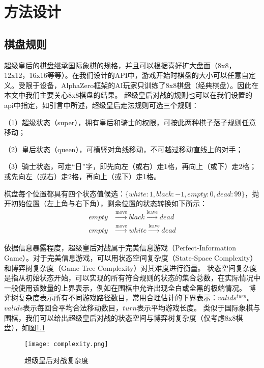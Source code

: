 \chapter{方法设计}
\label{chap:algorithm}

\section{棋盘规则}
超级皇后的棋盘继承国际象棋的规格，并且可以根据喜好扩大盘面（8x8，12x12，16x16等等）。在我们设计的API中，游戏开始时棋盘的大小可以任意自定义。受限于设备，AlphaZero框架的AI玩家只训练了8x8棋盘（经典棋盘）。因此在本文中我们主要关心8x8棋盘的结果。
超级皇后对战的规则也可以在我们设置的api中指定，如引言中所述，超级皇后走法规则可选三个规则：

（1）超级状态（super），拥有皇后和骑士的权限，可按此两种棋子落子规则任意移动；

（2）皇后状态（queen），可横竖对角线移动，不可越过移动直线上的对手；

（3）骑士状态，可走“日”字，即先向左（或右）走1格，再向上（或下）走2格；或先向左（或右）走2格，再向上（或下）走1格。

棋盘每个位置都具有四个状态值候选：$\{white:1, black:-1,empty:0,dead:99\}$，抛开初始位置（左上角与右下角），剩余位置的状态转换如下所示：
\begin{equation}
    \begin{aligned}
    empty &\stackrel{\mathrm{move}}{\longrightarrow} black \stackrel{\mathrm{leave}}{\longrightarrow} dead \\
    empty &\stackrel{\mathrm{move}}{\longrightarrow} white \stackrel{\mathrm{leave}}{\longrightarrow} dead 
    \end{aligned}
\end{equation}

依据信息暴露程度，超级皇后对战属于完美信息游戏（Perfect-Information Game）\cite{binmore2007game}。对于完美信息游戏，可以用状态空间复杂度（State-Space Complexity）和博弈树复杂度（Game-Tree Complexity）对其难度进行衡量\cite{allis1994searching,VANDENHERIK2002277}。
状态空间复杂度是指从初始状态开始，可以实现的所有符合规则的状态的集合总数，在实际情况中一般使用该数量的上界表示，例如在围棋中允许出现全白或全黑的极端情况。
博弈树复杂度表示所有不同游戏路径数目，常用合理估计的下界表示：$valids^{turn}$。 $valids$表示每回合平均合法移动数目，$turn$表示平均游戏长度\cite{10.1007/BF00992697}。
类似于国际象棋与围棋，我们可以给出超级皇后对战的状态空间与博弈树复杂度（仅考虑8x8棋盘），如图\ref{fig:complexity}
\begin{figure}[htb]
    \centering
    \texttt{[image: complexity.png]}
    \caption[complexity]{%
        超级皇后对战复杂度\cite{enwiki:complexity}%
      }
    \label{fig:complexity}
\end{figure}

